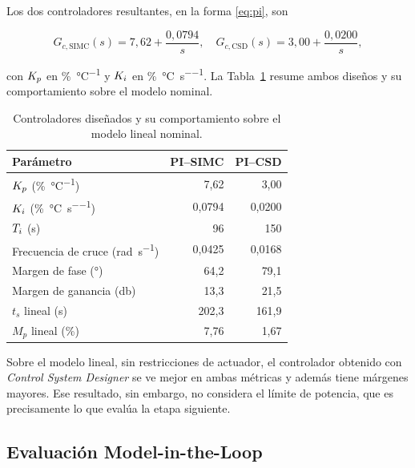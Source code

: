 Los dos controladores resultantes, en la forma \eqref{eq:pi}, son

\begin{equation}
G_{c,\mathrm{SIMC}}(s) = 7{,}62 + \frac{0{,}0794}{s},
\quad
G_{c,\mathrm{CSD}}(s) = 3{,}00 + \frac{0{,}0200}{s},
\label{eq:gc}
\end{equation}

con $K_p$ en \si{\percent\per\celsius} y $K_i$ en \si{\percent\per\celsius\per\second}. La
Tabla~\ref{tab:controladores} resume ambos diseños y su comportamiento sobre el modelo nominal.

\begin{table}[!t]
\caption{Controladores diseñados y su comportamiento sobre el modelo lineal nominal.}
\label{tab:controladores}
\centering
\footnotesize
\begin{tabular}{@{}lrr@{}}
\toprule
\textbf{Parámetro} & \textbf{PI--SIMC} & \textbf{PI--CSD} \\
\midrule
$K_p$ (\si{\percent\per\celsius})                & 7,62   & 3,00 \\
$K_i$ (\si{\percent\per\celsius\per\second})    & 0,0794 & 0,0200 \\
$T_i$ (\si{\second})                             & 96     & 150 \\
\midrule
Frecuencia de cruce (\si{\radian\per\second})    & 0,0425 & 0,0168 \\
Margen de fase (\si{\degree})                     & 64,2   & 79,1 \\
Margen de ganancia (\si{\decibel})                & 13,3   & 21,5 \\
\midrule
$t_s$ lineal (\si{\second})                       & 202,3  & 161,9 \\
$M_p$ lineal (\si{\percent})                      & 7,76   & 1,67 \\
\bottomrule
\end{tabular}
\end{table}

Sobre el modelo lineal, sin restricciones de actuador, el controlador obtenido con
\emph{Control System Designer} se ve mejor en ambas métricas y además tiene márgenes mayores. Ese
resultado, sin embargo, no considera el límite de potencia, que es precisamente lo que evalúa la
etapa siguiente.

\subsection{Evaluación Model-in-the-Loop}

